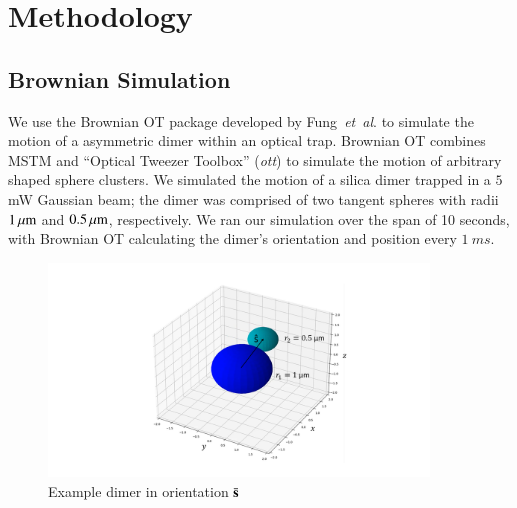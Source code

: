\documentclass[final, 3p]{elsarticle}
\begin{document}
\section{Methodology}
\label{sec:Method}

\subsection{Brownian Simulation}
\label{sec:brownian}

We use the Brownian OT package developed by Fung~\textit{et~al}. \cite{Vigilante2020Brownian_OT} to simulate the motion of a asymmetric dimer within an optical trap.  Brownian OT combines MSTM \cite{Mishchenko1996MSTM} and ``Optical Tweezer Toolbox'' (\textit{ott}) \cite{Lenton2020} to simulate the motion of arbitrary
shaped sphere clusters. We simulated the motion of a silica dimer
trapped in a $5$ mW Gaussian beam; the dimer was comprised of two tangent spheres with radii $1\,{\rm \mu m}$ and $ 0.5\,{\rm \mu m}$, respectively.  We ran our simulation over the span of 10 seconds, with Brownian OT calculating the dimer's orientation and position every $1 \ ms$.

\begin{figure}[h]
	\centering
	\includegraphics[width=0.9\textwidth]{./Images/fig2.png}
	\caption{Example dimer in orientation $\bar{\bf s}$}
	\label{fig:dimer}
\end{figure}
\end{document}
